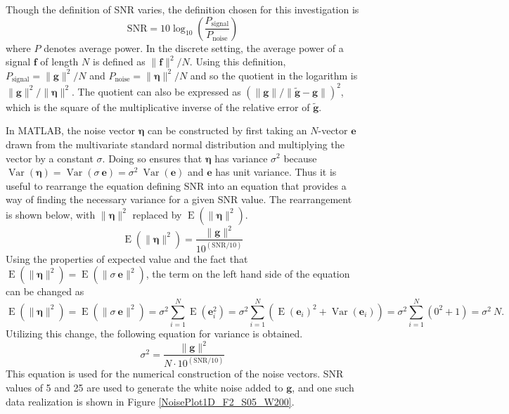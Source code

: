 \documentclass[12pt]{article}
\newcommand{\gdis}{\mathbf{g}}
\newcommand{\gnoise}{\widetilde{\mathbf{g}}}
\newcommand{\noiseSD}{\sigma}	%
\newcommand{\noise}{\bm{\eta}}	%
\newcommand{\Var}{\operatorname{Var}}	%
\newcommand{\E}{\operatorname{E}}	%
\begin{document}
Though the definition of SNR varies, the definition chosen for this investigation is
\begin{equation}
\label{Eq_SNR}
\text{SNR} = 10\log_{10}\left(\frac{P_{\text{signal}}}{P_{\text{noise}}}\right)
\end{equation}
where $P$ denotes average power. In the discrete setting, the average power of a signal $\mathbf{f}$ of length $N$ is defined as $\|\mathbf{f}\|^2/N$. Using this definition, $P_{\text{signal}} = \|\gdis\|^2/N$ and $P_{\text{noise}} = \|\noise\|^2/N$ and so the quotient in the logarithm is $\|\gdis\|^2/\|\noise\|^2$. The quotient can also be expressed as $(\|\gdis\|/\|\gnoise - \gdis\|)^2$, which is the square of the multiplicative inverse of the relative error of $\gnoise$. \par
In MATLAB, the noise vector $\noise$ can be constructed by first taking an $N$-vector $\mathbf{e}$ drawn from the multivariate standard normal distribution and multiplying the vector by a constant $\noiseSD$. Doing so ensures that $\noise$ has variance $\noiseSD^2$ because $\Var(\noise) = \Var(\noiseSD\:\mathbf{e}) = \noiseSD^2\:\Var(\mathbf{e})$ and $\mathbf{e}$ has unit variance. Thus it is useful to rearrange the equation defining SNR into an equation that provides a way of finding the necessary variance for a given SNR value. The rearrangement is shown below, with $\|\noise\|^2$ replaced by $\E(\|\noise\|^2)$.
\[\E(\|\noise\|^2) = \frac{\|\gdis\|^2}{10^{(\text{SNR}/10)}}\]
Using the properties of expected value and the fact that $\E(\|\noise\|^2) = \E(\|\noiseSD\:\mathbf{e}\|^2)$, the term on the left hand side of the equation can be changed as
\[\E(\|\noise\|^2) = \E(\|\noiseSD\:\mathbf{e}\|^2) = \noiseSD^2 \sum_{i=1}^N \E(\mathbf{e}_i^2) = \noiseSD^2 \sum_{i=1}^N \left(\E(\mathbf{e}_i)^2 + \Var(\mathbf{e}_i)\right) = \noiseSD^2 \sum_{i=1}^N \left(0^2 + 1\right) = \noiseSD^2\:N.\]
Utilizing this change, the following equation for variance is obtained.
\begin{equation}
\label{Eq_Var}
\noiseSD^2 = \frac{\|\gdis\|^2}{N \cdot 10^{(\text{SNR}/10)}}
\end{equation}
This equation is used for the numerical construction of the noise vectors. SNR values of 5 and 25 are used to generate the white noise added to $\gdis$, and one such data realization is shown in Figure \ref{NoisePlot1D_F2_S05_W200}. \par
\end{document}
